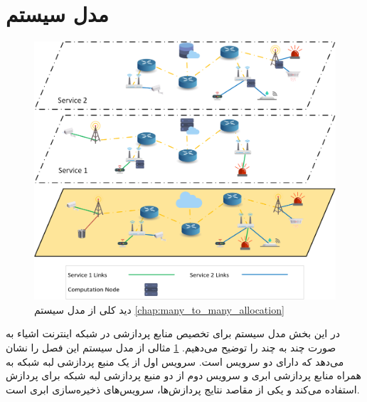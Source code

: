   \section{مدل سیستم}
    \begin{figure}[]
      \centerline{\includegraphics[width=15cm]{graphics/many_to_many/system_model}}
      \caption{دید کلی از مدل سیستم \cref{chap:many_to_many_allocation}}
      \label{fig:many_to_many:system_model}
    \end{figure}
    در این بخش مدل سیستم برای تخصیص منابع پردازشی در شبکه اینترنت اشیاء به صورت چند به چند را توضیح می‌دهیم.
    \cref{fig:many_to_many:system_model} مثالی از مدل سیستم این فصل را نشان می‌دهد که دارای دو سرویس است.
    سرویس اول از یک منبع پردازشی لبه شبکه به همراه منابع پردازشی ابری و سرویس دوم از دو منبع پردازشی لبه شبکه برای پردازش استفاده می‌کند و یکی از مقاصد نتایج پردازش‌ها، سرویس‌های ذخیره‌سازی ابری است.

